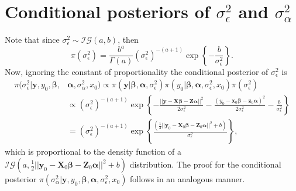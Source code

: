 \documentclass[cmfont,usenames,dvipsnames,leqno]{afit-etd}\usepackage[]{graphicx}\usepackage[]{color}
\begin{document}
\section{Conditional posteriors of \texorpdfstring{$\sigma_\epsilon^2$ and $\sigma_\alpha^2$}{variance components}}
\label{sec:conditional-variances}
Note that since $\sigma_\epsilon^2 \sim \mathcal{IG}\left(a, b\right)$, then 
\begin{equation*}
  \pi(\sigma_\epsilon^2) = \frac{b^a}{\Gamma(a)}\left(\sigma_\epsilon^2\right)^{-(a+1)}\exp\left\{-\frac{b}{\sigma_\epsilon^2}\right\}.
\end{equation*}
Now, ignoring the constant of proportionality the conditional posterior of $\sigma_\epsilon^2$ is
\begin{align*}
  \pi(\sigma_\epsilon^2|\boldsymbol{y}, y_0, \boldsymbol{\beta}, &\boldsymbol{\alpha}, \sigma_\alpha^2, x_0) \propto \pi(\boldsymbol{y}|\boldsymbol{\beta}, \boldsymbol{\alpha}, \sigma_\epsilon^2)\pi(y_0|\boldsymbol{\beta}, \boldsymbol{\alpha}, \sigma_\epsilon^2, x_0)\pi(\sigma_\epsilon^2) \\
  &\propto \left(\sigma_\epsilon^2\right)^{-(a+1)}\exp\left\{-\frac{||\boldsymbol{y} - \boldsymbol{X}\boldsymbol{\beta} - \boldsymbol{Z}\boldsymbol{\alpha}||^2}{2\sigma_\epsilon^2} - \frac{\left(y_0 - \boldsymbol{x}_0\boldsymbol{\beta} - \boldsymbol{z}_0\boldsymbol{\alpha}\right)^2}{2\sigma_\epsilon^2} - \frac{b}{\sigma_\epsilon^2}\right\} \\
  &= \left(\sigma_\epsilon^2\right)^{-(a+1)}\exp\left\{\frac{\left(\frac{1}{2}||\boldsymbol{y}_0 - \boldsymbol{X}_0\boldsymbol{\beta} - \boldsymbol{Z}_0\boldsymbol{\alpha}||^2 + b\right)}{\sigma_\epsilon^2}\right\},
\end{align*}
which is proportional to the density function of a $\mathcal{IG}\left(a, \frac{1}{2}||\boldsymbol{y}_0 - \boldsymbol{X}_0\boldsymbol{\beta} - \boldsymbol{Z}_0\boldsymbol{\alpha}||^2 + b\right)$ distribution. The proof for the conditional posterior $\pi(\sigma_\alpha^2|\boldsymbol{y}, y_0, \boldsymbol{\beta}, \boldsymbol{\alpha}, \sigma_\epsilon^2, x_0)$ follows in an analogous manner.
\end{document}
